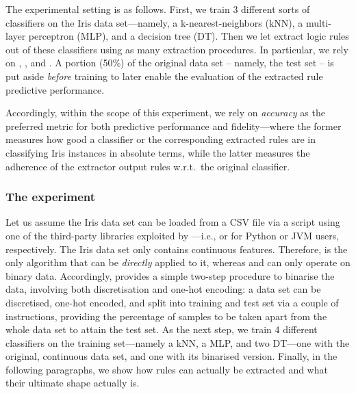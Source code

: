 \documentclass[12pt,a4paper,openright,twoside]{book}
\begin{document}
The experimental setting is as follows.
%
First, we train 3 different sorts of classifiers on the Iris data set---namely, a k-nearest-neighbors (kNN), a multi-layer perceptron (MLP), and a decision tree (DT).
%
Then we let \psyke{} extract logic rules out of these classifiers using as many extraction procedures.
%
In particular, we rely on \real{}, \trepan{}, and \cart{}.
%
A portion (50\%) of the original data set -- namely, the test set -- is put aside \emph{before} training to later enable the evaluation of the extracted rule predictive performance.

Accordingly, within the scope of this experiment, we rely on \emph{accuracy} as the preferred metric for both predictive performance and fidelity---where the former measures how good a classifier or the corresponding extracted rules are in classifying Iris instances in absolute terms, while the latter measures the adherence of the extractor output rules w.r.t.\ the original classifier.

\subsubsection{The experiment}

Let us assume the Iris data set can be loaded from a CSV file via a script using one of the third-party libraries exploited by \psyke{}---i.e., \scikit{} or \smile{} for Python or JVM users, respectively.
%
The Iris data set only contains continuous features.
%
Therefore, \cart{} is the only algorithm that can be \emph{directly} applied to it, whereas \real{} and \trepan{} can only operate on binary data.
%
Accordingly, \psyke{} provides a simple two-step procedure to binarise the data, involving both discretisation and one-hot encoding: a data set can be discretised, one-hot encoded, and split into training and test set via a couple of instructions, providing the percentage of samples to be taken apart from the whole data set to attain the test set.
%
As the next step, we train 4 different classifiers on the training set---namely a kNN, a MLP, and two DT---one with the original, continuous data set, and one with its binarised version\footnotemark.
%
Finally, in the following paragraphs, we show how rules can actually be extracted and what their ultimate shape actually is.
\end{document}
